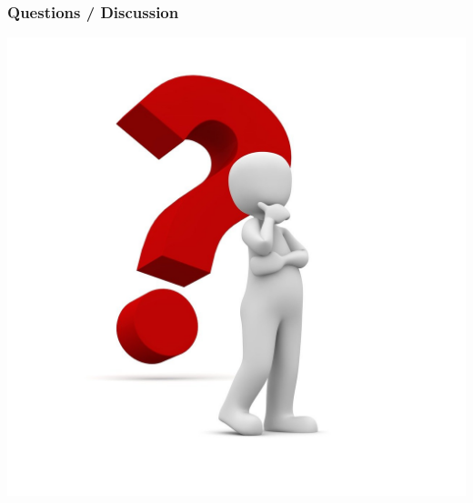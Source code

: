 \begin{frame}
    \frametitle{Questions / Discussion}
    \centering
    \includegraphics[width=0.5\linewidth]{../assets/questions.jpg}
\end{frame}
